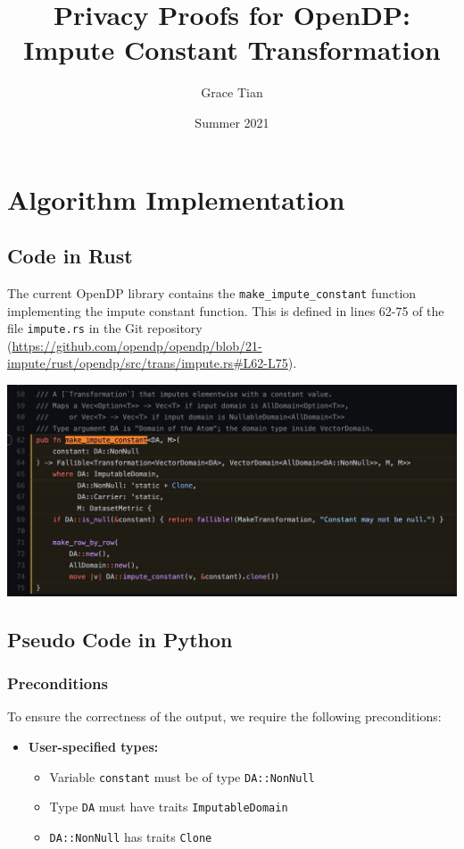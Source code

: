 \documentclass[11pt,a4paper]{article}
\title{Privacy Proofs for OpenDP: Impute Constant Transformation}
\author{Grace Tian}
\date{Summer 2021}
\begin{document}
\maketitle
\tableofcontents

\section{Algorithm Implementation}
\subsection{Code in Rust}
The current OpenDP library contains the \texttt{make\_impute\_constant} function implementing the impute constant function. This is defined in lines 62-75 of the file \texttt{impute.rs} in the Git repository (\url{https://github.com/opendp/opendp/blob/21-impute/rust/opendp/src/trans/impute.rs#L62-L75}).

\includegraphics[width=\textwidth]{make_impute_constant.jpg}


\subsection{Pseudo Code in Python}\label{sec:pseudocode}

\subsubsection*{Preconditions}
To ensure the correctness of the output, we require the following preconditions:

\begin{itemize}
    \item \textbf{User-specified types:}
    \begin{itemize}
        \item Variable \texttt{\texttt{constant}} must be of type \texttt{DA::NonNull}
        \item Type \texttt{DA} must have traits \texttt{ImputableDomain} 
        \item \texttt{DA::NonNull} has traits \texttt{Clone}
    \end{itemize}
\end{itemize}
\end{document}
